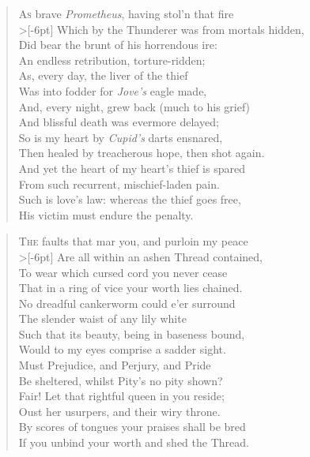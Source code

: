 \documentclass[a5paper, 12pt, oneside]{memoir}
\begin{document}
\PoemTitle{}
\begin{verse}
    \lettrine{A}{s} brave \textit{Prometheus}, having stol'n that fire \\>[-6pt]
    Which by the Thunderer was from mortals hidden, \\
    Did bear the brunt of his horrendous ire: \\
    An endless retribution, torture-ridden; \\
    As, every day, the liver of the thief \\
    Was into fodder for \textit{Jove's} eagle made, \\
    And, every night, grew back (much to his grief) \\
    And blissful death was evermore delayed; \\
    So is my heart by \textit{Cupid's} darts ensnared, \\
    Then healed by treacherous hope, then shot again. \\
    And yet the heart of my heart's thief is spared \\
    From such recurrent, mischief-laden pain. \\
    \vin Such is love's law: whereas the thief goes free, \\
    \vin His victim must endure the penalty. 
\end{verse}

\PoemTitle{}
\begin{verse}
    \lettrine{T}{he} faults that mar you, and purloin my peace \\>[-6pt]
    Are all within an ashen Thread contained, \\
    To wear which cursed cord you never cease \\
    That in a ring of vice your worth lies chained. \\
    No dreadful cankerworm could e'er surround \\
    The slender waist of any lily white \\
    Such that its beauty, being in baseness bound, \\
    Would to my eyes comprise a sadder sight. \\
    Must Prejudice, and Perjury, and Pride \\
    Be sheltered, whilst Pity's no pity shown? \\
    Fair! Let that rightful queen in you reside; \\
    Oust her usurpers, and their wiry throne. \\
    \vin By scores of tongues your praises shall be bred \\
    \vin If you unbind your worth and shed the Thread.
\end{verse}
\end{document}

